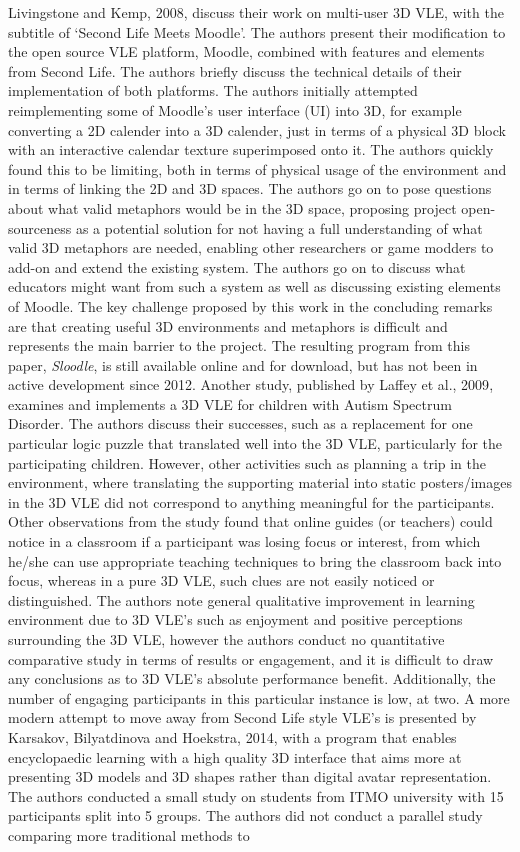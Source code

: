 \documentclass[11pt]{report}
\begin{document}
Livingstone and Kemp, 2008\cite{Livingstone2008}, discuss their work on multi-user 3D VLE, with the subtitle of `Second Life Meets Moodle'. The authors present their modification to the open source VLE platform, Moodle, combined with features and elements from Second Life. The authors briefly discuss the technical details of their implementation of both platforms. The authors initially attempted reimplementing some of Moodle's user interface (UI) into 3D, for example converting a 2D calender into a 3D calender, just in terms of a physical 3D block with an interactive calendar texture superimposed onto it. The authors quickly found this to be limiting, both in terms of physical usage of the environment and in terms of linking the 2D and 3D spaces. The authors go on to pose questions about what valid metaphors would be in the 3D space, proposing project open-sourceness as a potential solution for not having a full understanding of what valid 3D metaphors are needed, enabling other researchers or game modders to add-on and extend the existing system. The authors go on to discuss what educators might want from such a system as well as discussing existing elements of Moodle. The key challenge proposed by this work in the concluding remarks are that creating useful 3D environments and metaphors is difficult and represents the main barrier to the project. The resulting program from this paper, \textit{Sloodle}, is still available online and for download, but has not been in active development since 2012. Another study, published by Laffey et al., 2009\cite{Laffey2009}, examines and implements a 3D VLE for children with Autism Spectrum Disorder. The authors discuss their successes, such as a replacement for one particular logic puzzle that translated well into the 3D VLE, particularly for the participating children. However, other activities such as planning a trip in the environment, where translating the supporting material into static posters/images in the 3D VLE did not correspond to anything meaningful for the participants. Other observations from the study found that online guides (or teachers) could notice in a classroom if a participant was losing focus or interest, from which he/she can use appropriate teaching techniques to bring the classroom back into focus, whereas in a pure 3D VLE, such clues are not easily noticed or distinguished. The authors note general qualitative improvement in learning environment due to 3D VLE's such as enjoyment and positive perceptions surrounding the 3D VLE, however the authors conduct no quantitative comparative study in terms of results or engagement, and it is difficult to draw any conclusions as to 3D VLE's absolute performance benefit. Additionally, the number of engaging participants in this particular instance is low, at two. A more modern attempt to move away from Second Life style VLE's is presented by Karsakov, Bilyatdinova and Hoekstra, 2014\cite{Karsakov2014}, with a program that enables encyclopaedic learning with a high quality 3D interface that aims more at presenting 3D models and 3D shapes rather than digital avatar representation. The authors conducted a small study on students from ITMO university with 15 participants split into 5 groups. The authors did not conduct a parallel study comparing more traditional methods to 
\end{document}
